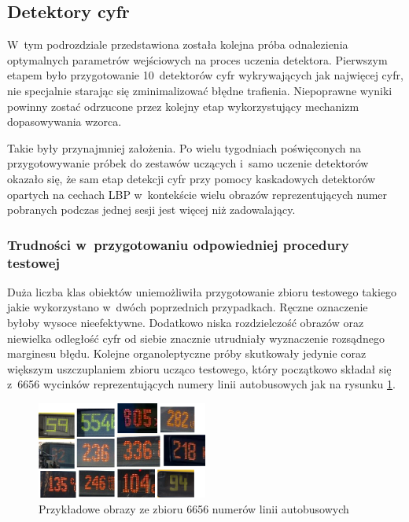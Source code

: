 \subsection{Detektory cyfr}

W~tym podrozdziale przedstawiona została kolejna próba
odnalezienia optymalnych
parametrów wejściowych na proces uczenia detektora.
Pierwszym etapem było przygotowanie 10~detektorów cyfr
wykrywających jak najwięcej cyfr, nie specjalnie starając się zminimalizować
błędne trafienia. Niepoprawne wyniki powinny zostać odrzucone
przez kolejny etap wykorzystujący mechanizm dopasowywania wzorca.

Takie były przynajmniej założenia. Po wielu tygodniach poświęconych
na przygotowywanie próbek do zestawów uczących i~samo uczenie
detektorów okazało się, że sam etap detekcji cyfr przy pomocy kaskadowych
detektorów opartych na cechach LBP w~kontekście wielu obrazów reprezentujących
numer pobranych podczas jednej sesji jest więcej niż zadowalający.

\subsubsection{Trudności w~przygotowaniu odpowiedniej procedury testowej}

Duża liczba klas obiektów uniemożliwiła przygotowanie zbioru testowego
takiego jakie wykorzystano w~dwóch poprzednich przypadkach. 
Ręczne oznaczenie byłoby wysoce nieefektywne. Dodatkowo 
niska rozdzielczość obrazów oraz niewielka odległość cyfr od siebie
znacznie utrudniały wyznaczenie rozsądnego marginesu błędu.
Kolejne organoleptyczne próby skutkowały jedynie coraz większym uszczuplaniem
zbioru ucząco testowego, który początkowo składał się 
z~6656 wycinków reprezentujących numery linii autobusowych
jak na rysunku \ref{fig:number_test_sample}.

\begin{figure}[!h]
	\centering
	\includegraphics[width=0.5\textwidth]{img/number_test_sample}
	\caption{Przykładowe obrazy ze zbioru 6656 numerów linii autobusowych}
	\label{fig:number_test_sample}
\end{figure}

